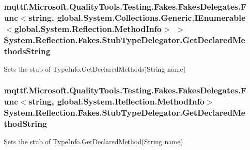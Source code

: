 \hypertarget{class_system_1_1_reflection_1_1_fakes_1_1_stub_type_delegator_a70f63b79f87fa529842e76f87dbb0d39}{
\subsubsection[{Get\-Declared\-Methods\-String}]{\setlength{\rightskip}{0pt plus 5cm}mqttf.\-Microsoft.\-Quality\-Tools.\-Testing.\-Fakes.\-Fakes\-Delegates.\-Func$<$string, global.\-System.\-Collections.\-Generic.\-I\-Enumerable$<$global.\-System.\-Reflection.\-Method\-Info$>$ $>$ System.\-Reflection.\-Fakes.\-Stub\-Type\-Delegator.\-Get\-Declared\-Methods\-String}}\label{class_system_1_1_reflection_1_1_fakes_1_1_stub_type_delegator_a70f63b79f87fa529842e76f87dbb0d39}


Sets the stub of Type\-Info.\-Get\-Declared\-Methods(\-String name)

\hypertarget{class_system_1_1_reflection_1_1_fakes_1_1_stub_type_delegator_a766428f21437c57fcab4b952d305ea25}{
\subsubsection[{Get\-Declared\-Method\-String}]{\setlength{\rightskip}{0pt plus 5cm}mqttf.\-Microsoft.\-Quality\-Tools.\-Testing.\-Fakes.\-Fakes\-Delegates.\-Func$<$string, global.\-System.\-Reflection.\-Method\-Info$>$ System.\-Reflection.\-Fakes.\-Stub\-Type\-Delegator.\-Get\-Declared\-Method\-String}}\label{class_system_1_1_reflection_1_1_fakes_1_1_stub_type_delegator_a766428f21437c57fcab4b952d305ea25}


Sets the stub of Type\-Info.\-Get\-Declared\-Method(\-String name)


